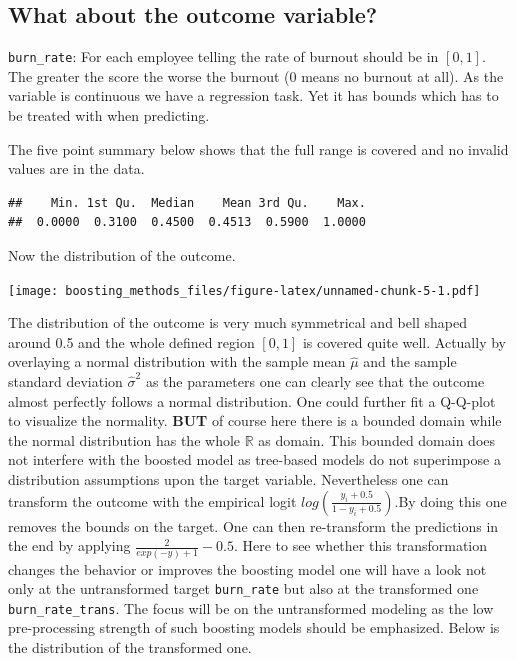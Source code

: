 \documentclass[
]{book}
\begin{document}
\hypertarget{what-about-the-outcome-variable}{%
\subsection{What about the outcome variable?}\label{what-about-the-outcome-variable}}

\texttt{burn\_rate}: For each employee telling the rate of burnout should be in \([0,1]\). The greater the score the worse the burnout (0 means no burnout at all). As the variable is continuous we have a regression task. Yet it has bounds which has to be treated with when predicting.

The five point summary below shows that the full range is covered and no invalid values are in the data.

\begin{verbatim}
##    Min. 1st Qu.  Median    Mean 3rd Qu.    Max. 
##  0.0000  0.3100  0.4500  0.4513  0.5900  1.0000
\end{verbatim}

Now the distribution of the outcome.

\texttt{[image: boosting\_methods\_files/figure-latex/unnamed-chunk-5-1.pdf]}

The distribution of the outcome is very much symmetrical and bell shaped around 0.5 and the whole defined region \([0,1]\) is covered quite well. Actually by overlaying a normal distribution with the sample mean \(\hat{\mu}\) and the sample standard deviation \(\hat{\sigma}^2\) as the parameters one can clearly see that the outcome almost perfectly follows a normal distribution. One could further fit a Q-Q-plot to visualize the normality. \textbf{BUT} of course here there is a bounded domain while the normal distribution has the whole \(\mathbb{R}\) as domain. This bounded domain does not interfere with the boosted model as tree-based models do not superimpose a distribution assumptions upon the target variable. Nevertheless one can transform the outcome with the empirical logit \(log(\frac{y_i+0.5}{1-y_i+0.5})\).By doing this one removes the bounds on the target. One can then re-transform the predictions in the end by applying \(\frac{2}{exp(-y)+1}-0.5\). Here to see whether this transformation changes the behavior or improves the boosting model
one will have a look not only at the untransformed target \texttt{burn\_rate} but also at the transformed one \texttt{burn\_rate\_trans}. The focus will be on the untransformed modeling as the low pre-processing strength of such boosting models should be emphasized. Below is the distribution of the transformed one.
\end{document}
